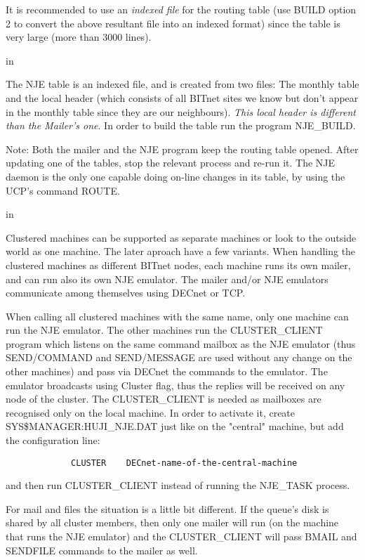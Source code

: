 It is recommended to use an {\sl indexed file} for  the  routing  table  (use
BUILD  option  2  to  convert  the  above resultant file into an indexed
format) since the table is very large (more than 3000 lines).

 in

The NJE table is an indexed file, and is created from two files:  The
monthly  table  and the local header (which consists of all BITnet sites
we know but don't appear  in  the  monthly  table  since  they  are  our
neighbours). {\sl This  local  header is different than the Mailer's one}. In
order to build the table run the program NJE\_BUILD.

{\ncrBold Note:}
 Both the mailer and the NJE program keep the routing table opened.
After  updating  one of the tables, stop the relevant process and re-run
it. The NJE daemon is the only one capable doing on-line changes in  its
table, by using the UCP's command ROUTE.

 in

Clustered  machines  can be supported as separate machines or look to
the outside world as one machine. The later aproach have a few variants.
When  handling the clustered machines as different BITnet nodes, each
machine runs its own mailer, and can run also its own NJE emulator.  The
mailer and/or NJE emulators communicate among themselves using DECnet or
TCP.

When calling all clustered machines with  the  same  name,  only  one
machine   can   run  the  NJE  emulator.  The  other  machines  run  the
CLUSTER\_CLIENT program which listens on the same command mailbox as  the
NJE  emulator  (thus  SEND/COMMAND and SEND/MESSAGE are used without any
change on the other machines) and pass via DECnet the  commands  to  the
emulator.  The  emulator broadcasts using Cluster flag, thus the replies
will be received on any node  of  the  cluster.  The  CLUSTER\_CLIENT  is
needed as mailboxes are recognised only on the local machine.
In  order  to  activate it, create SYS\$MANAGER:HUJI\_NJE.DAT just like
on the "central" machine, but add the configuration line:

{\tt ~~~~~~~~~~~~~CLUSTER ~~~DECnet-name-of-the-central-machine}

and then run CLUSTER\_CLIENT instead of running the NJE\_TASK process.

For mail and files the situation is a little bit  different.  If  the
queue's disk is shared by all cluster members, then only one mailer will
run (on the machine that runs the NJE emulator) and  the  CLUSTER\_CLIENT
will pass BMAIL and SENDFILE commands to the mailer as well.


